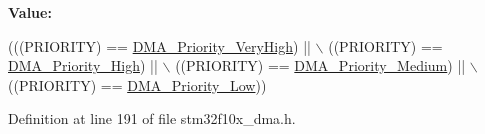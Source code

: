 {\bfseries Value\+:}
\begin{DoxyCode}
(((PRIORITY) == \hyperlink{group___d_m_a__priority__level_gadccd2f8b2ac24ba4fd485dd5b9b48671}{DMA\_Priority\_VeryHigh}) || \(\backslash\)
                                   ((PRIORITY) == \hyperlink{group___d_m_a__priority__level_gae2441c0b4d4ba9945a6f4f7d08045a8e}{DMA\_Priority\_High}) || \(\backslash\)
                                   ((PRIORITY) == \hyperlink{group___d_m_a__priority__level_ga8e0d4a958f4288c6c759945789490f38}{DMA\_Priority\_Medium}) || \(\backslash\)
                                   ((PRIORITY) == \hyperlink{group___d_m_a__priority__level_gaf414e0aa8dd42aee6f83f88ab6175179}{DMA\_Priority\_Low}))
\end{DoxyCode}


Definition at line 191 of file stm32f10x\+\_\+dma.\+h.

